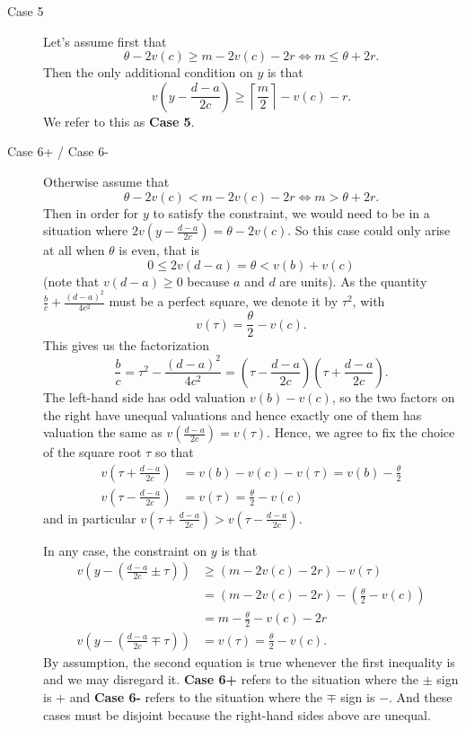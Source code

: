 \begin{description}
  \item[Case 5]
  Let's assume first that
  \[ \theta - 2v(c) \ge m - 2v(c) - 2r \iff m \le \theta + 2r. \]
  Then the only additional condition on $y$ is that
  \[
    v\left( y - \frac{d-a}{2c} \right)
    \ge \left\lceil \frac{m}{2} \right\rceil - v(c) - r.
  \]
  We refer to this as \textbf{Case 5}.

  \item[Case 6\ts+ / Case 6\ts-]
  Otherwise assume that
  \[ \theta - 2v(c) < m - 2v(c) - 2r \iff m > \theta + 2r. \]
  Then in order for $y$ to satisfy the constraint,
  we would need to be in a situation where $2v(y - \frac{d-a}{2c}) = \theta - 2v(c)$.
  So this case could only arise at all when $\theta$ is even, that is
  \[ 0 \le 2v(d-a) = \theta < v(b) + v(c) \]
  (note that $v(d-a) \ge 0$ because $a$ and $d$ are units).
  As the quantity $\frac bc + \frac{(d-a)^2}{4c^2}$ must be a perfect square,
  we denote it by $\tau^2$, with
  \[ v(\tau) = \frac{\theta}{2} - v(c). \]
  This gives us the factorization
  \[ \frac bc = \tau^2 - \frac{(d-a)^2}{4c^2}
    = \left( \tau - \frac{d-a}{2c} \right) \left( \tau + \frac{d-a}{2c} \right). \]
  The left-hand side has odd valuation $v(b) - v(c)$,
  so the two factors on the right have unequal valuations
  and hence exactly one of them has valuation the same as $v(\frac{d-a}{2c}) = v(\tau)$.
  Hence, we agree to fix the choice of the square root $\tau$ so that
  \begin{align*}
    v\left( \tau + \frac{d-a}{2c} \right) &= v(b) - v(c) - v(\tau) = v(b) - \frac{\theta}{2} \\
    v\left( \tau - \frac{d-a}{2c} \right) &= v(\tau) = \frac{\theta}{2} - v(c)
  \end{align*}
  and in particular
  $v\left( \tau + \frac{d-a}{2c} \right) > v\left( \tau - \frac{d-a}{2c} \right)$.

  In any case, the constraint on $y$ is that
  \begin{align*}
    v\left( y - \left( \frac{d-a}{2c} \pm \tau \right) \right)
      &\ge \left( m - 2v(c) - 2r \right) - v(\tau) \\
      &= \left( m - 2v(c) - 2r \right) - \left( \frac{\theta}{2} - v(c) \right) \\
      &= m - \frac{\theta}{2} - v(c) - 2r \\
    v\left( y - \left( \frac{d-a}{2c} \mp \tau \right) \right) &= v(\tau)
      = \frac{\theta}{2} - v(c).
  \end{align*}
  By assumption, the second equation is true
  whenever the first inequality is and we may disregard it.
  \textbf{Case 6\ts+} refers to the situation where the $\pm$ sign is $+$
  and \textbf{Case 6\ts-} refers to the situation where the $\mp$ sign is $-$.
  And these cases must be disjoint because the right-hand sides above are unequal.
\end{description}

